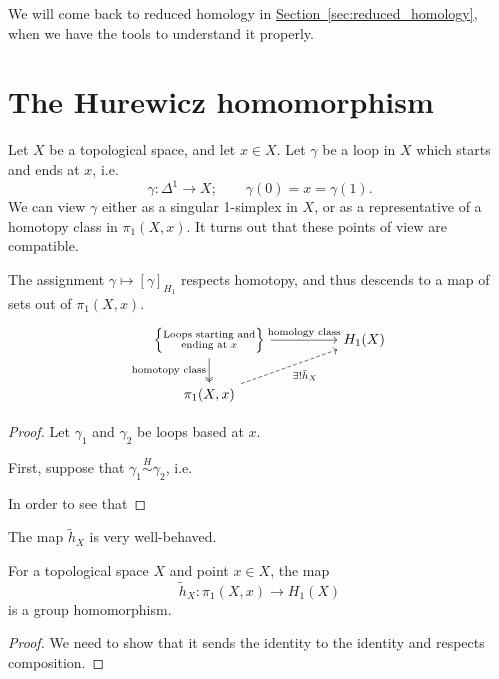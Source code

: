 \documentclass[main.tex]{subfiles}
\begin{document}
We will come back to reduced homology in \hyperref[sec:reduced_homology]{Section~\ref*{sec:reduced_homology}}, when we have the tools to understand it properly.

\section{The Hurewicz homomorphism}
\label{sec:the_hurewicz_homomorphism}

Let $X$ be a topological space, and let $x \in X$. Let $\gamma$ be a loop in $X$ which starts and ends at $x$, i.e.\
\begin{equation*}
  \gamma\colon \Delta^{1} \to X;\qquad \gamma(0) = x = \gamma(1).
\end{equation*}
We can view $\gamma$ either as a singular 1-simplex in $X$, or as a representative of a homotopy class in $\pi_{1}(X, x)$. It turns out that these points of view are compatible.

\begin{lemma}
  \label{lemma:hurewicz_respects_homology_class}
  The assignment $\gamma \mapsto [\gamma]_{H_{1}}$ respects homotopy, and thus descends to a map of sets out of $\pi_{1}(X, x)$.
  \begin{equation*}
    \begin{tikzcd}[column sep=huge]
      \left\{\substack{\text{Loops starting and}\\\text{ending at }x}\right\}
      \arrow[r, "\text{homology class}"]
      \arrow[d, two heads, swap, "\text{homotopy class}"]
      & H_{1}(X)
      \\
      \pi_{1}(X, x)
      \arrow[ur, dashed, swap, "\exists!\tilde{h}_{X}"]
    \end{tikzcd}
  \end{equation*}
\end{lemma}
\begin{proof}
  Let $\gamma_{1}$ and $\gamma_{2}$ be loops based at $x$.

  First, suppose that $\gamma_{1} \overset{H}{\sim} \gamma_{2}$, i.e.\

  In order to see that
\end{proof}

The map $\tilde{h}_{X}$ is very well-behaved.

\begin{lemma}
  \label{lemma:hurewicz_is_homomorphism}
  For a topological space $X$ and point $x \in X$, the map
  \begin{equation*}
    \tilde{h}_{X}\colon \pi_{1}(X, x) \to H_{1}(X)
  \end{equation*}
  is a group homomorphism.
\end{lemma}
\begin{proof}
  We need to show that it sends the identity to the identity and respects composition.
\end{proof}
\end{document}
